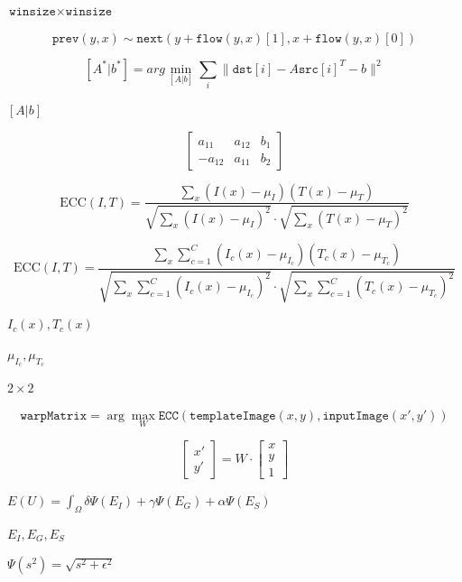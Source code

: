 \documentclass{article}
\begin{document}
$\texttt{winsize}\times\texttt{winsize}$
\pagebreak

\[\texttt{prev} (y,x)  \sim \texttt{next} ( y + \texttt{flow} (y,x)[1],  x + \texttt{flow} (y,x)[0])\]
\pagebreak

\[[A^*|b^*] = arg  \min _{[A|b]}  \sum _i  \| \texttt{dst}[i] - A { \texttt{src}[i]}^T - b  \| ^2\]
\pagebreak

$[A|b]$
\pagebreak

\[\begin{bmatrix} a_{11} & a_{12} & b_1  \\ -a_{12} & a_{11} & b_2  \end{bmatrix}\]
\pagebreak

\[\mathrm{ECC}(I, T) = \frac{\sum_{x} (I(x) - \mu_I)(T(x) - \mu_T)}
{\sqrt{\sum_{x} (I(x) - \mu_I)^2} \cdot \sqrt{\sum_{x} (T(x) - \mu_T)^2}}
\]
\pagebreak

\[\mathrm{ECC}(I, T) =
\frac{\sum_{x} \sum_{c=1}^{C} (I_c(x) - \mu_{I_c})(T_c(x) - \mu_{T_c})}
{\sqrt{\sum_{x} \sum_{c=1}^{C} (I_c(x) - \mu_{I_c})^2} \cdot
 \sqrt{\sum_{x} \sum_{c=1}^{C} (T_c(x) - \mu_{T_c})^2}}
\]
\pagebreak

$I_c(x), T_c(x)$
\pagebreak

$\mu_{I_c}, \mu_{T_c}$
\pagebreak

$2\times 2$
\pagebreak

\[\texttt{warpMatrix} = \arg\max_{W} \texttt{ECC}(\texttt{templateImage}(x,y),\texttt{inputImage}(x',y'))\]
\pagebreak

\[\begin{bmatrix} x' \\ y' \end{bmatrix} = W \cdot \begin{bmatrix} x \\ y \\ 1 \end{bmatrix}\]
\pagebreak

$E(U) = \int_{\Omega} \delta \Psi(E_I) + \gamma \Psi(E_G) + \alpha \Psi(E_S) $
\pagebreak

$E_I,E_G,E_S$
\pagebreak

$\Psi(s^2)=\sqrt{s^2+\epsilon^2}$
\pagebreak
\end{document}

